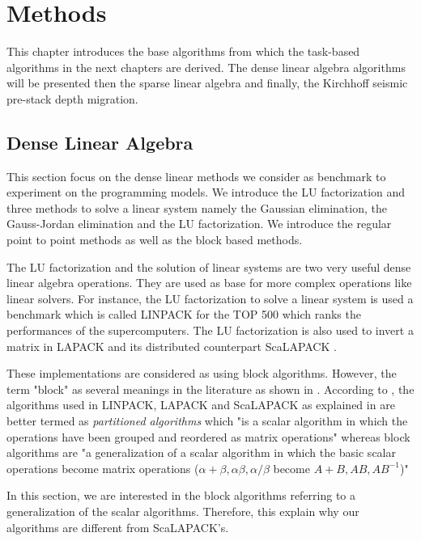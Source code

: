 \chapter{Methods}
\graphicspath{{chapters/methods/}}
This chapter introduces the base algorithms from which the task-based algorithms in the next chapters are derived.
The dense linear algebra algorithms will be presented then the sparse linear algebra and finally, the Kirchhoff seismic pre-stack depth migration.

\section{Dense Linear Algebra}

This section focus on the dense linear methods we consider as benchmark to experiment on the programming models.
We introduce the LU factorization and three methods to solve a linear system namely the Gaussian elimination, the Gauss-Jordan elimination and the LU factorization.
We introduce the regular point to point methods as well as the block based methods.


The LU factorization and the solution of linear systems are two very useful dense linear algebra operations.
They are used as base for more complex operations like linear solvers.
For instance, the LU factorization to solve a linear system is used a benchmark which is called LINPACK \cite{Parle1981} \cite{DonLP2003} for the TOP 500 which ranks the performances of the supercomputers.
The LU factorization is also used to invert a matrix in LAPACK \cite{ABBBD1999} and its distributed counterpart ScaLAPACK \cite{ChDPW1992} \cite{BCCDD1996}.

These implementations are considered as using block algorithms.
However, the term "block" as several meanings in the literature as shown in \cite{DemHS1995}.
According to \cite{DemHS1995}, the algorithms used in LINPACK, LAPACK and ScaLAPACK as explained in \cite{CDOPW1996} are better termed as \textit{partitioned algorithms} which "is a scalar algorithm in which the operations have been grouped and reordered as matrix operations" whereas block algorithms are "a generalization of a scalar algorithm in which the basic scalar operations become matrix operations ($\alpha + \beta, \alpha\beta, \alpha / \beta$ become $A+B, AB, AB^{-1}$)"

In this section, we are interested in the block algorithms referring to a generalization of the scalar algorithms.
Therefore, this explain why our algorithms are different from ScaLAPACK's.


